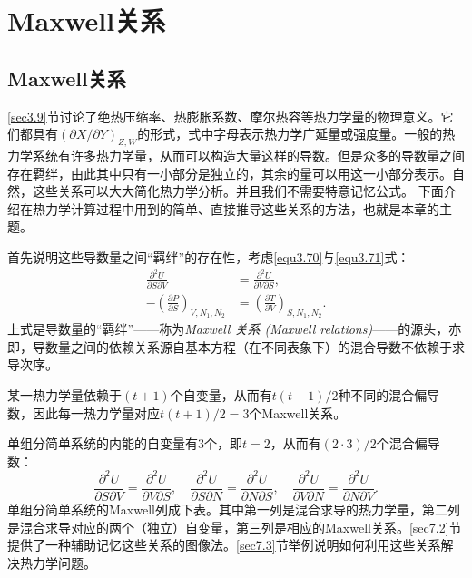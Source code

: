 
\chapter{Maxwell关系}
\label{chap7}

\section{Maxwell关系}
\label{sec7.1}
\ref{sec3.9}节讨论了绝热压缩率、热膨胀系数、摩尔热容等热力学量的物理意义。它们都具有$(\partial X / \partial Y)_{Z, W}$的形式，式中字母表示热力学广延量或强度量。一般的热力学系统有许多热力学量，从而可以构造大量这样的导数。但是众多的导数量之间存在羁绊，由此其中只有一小部分是独立的，其余的量可以用这一小部分表示。自然，这些关系可以大大简化热力学分析。并且我们不需要特意记忆公式。 下面介绍在热力学计算过程中用到的简单、直接推导这些关系的方法，也就是本章的主题。

首先说明这些导数量之间“羁绊”的存在性，考虑\eqref{equ3.70}与\eqref{equ3.71}式：
\begin{align}
	\frac{\partial^2 U}{\partial S \partial V} &= \frac{\partial^2 U}{\partial V \partial S}, \label{equ7.1} \\
	-\left( \frac{\partial P}{\partial S} \right)_{V, N_1, N_2} &= \left( \frac{\partial T}{\partial V} \right)_{S, N_1, N_2}. \label{equ7.2}
\end{align}
上式是导数量的“羁绊”——称为{\it Maxwell 关系 (Maxwell relations)}——的源头，亦即，导数量之间的依赖关系源自基本方程（在不同表象下）的混合导数不依赖于求导次序。

某一热力学量依赖于$(t + 1)$个自变量，从而有$t(t + 1)/2$种不同的混合偏导数，因此每一热力学量对应$t(t + 1)/2 = 3$个Maxwell关系。

单组分简单系统的内能的自变量有$3$个，即$t = 2$，从而有$(2 \cdot 3)/2$个混合偏导数：
\[
	\frac{\partial^2 U}{\partial S \partial V} = \frac{\partial^2 U}{\partial V \partial S}, \quad \frac{\partial^2 U}{\partial S \partial N} = \frac{\partial^2 U}{\partial N \partial S}, \quad \frac{\partial^2 U}{\partial V \partial N} = \frac{\partial^2 U}{\partial N \partial V}.
\]
单组分简单系统的Maxwell列成下表。其中第一列是混合求导的热力学量，第二列是混合求导对应的两个（独立）自变量，第三列是相应的Maxwell关系。\ref{sec7.2}节提供了一种辅助记忆这些关系的图像法。\ref{sec7.3}节举例说明如何利用这些关系解决热力学问题。

